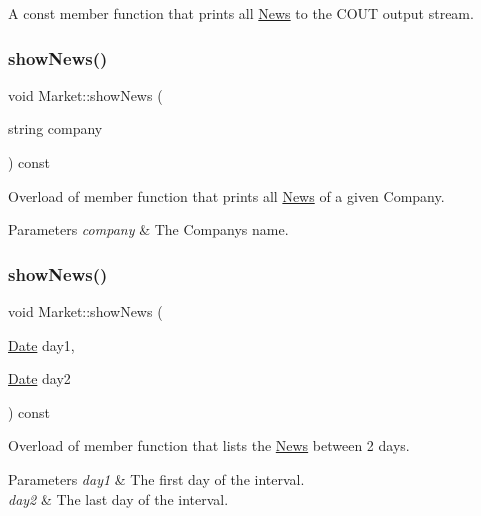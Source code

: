 A const member function that prints all \hyperlink{class_news}{News} to the C\+O\+UT output stream. \hypertarget{class_market_a535cb8ea17975f6f6525a23c84d44cbf}{}\label{class_market_a535cb8ea17975f6f6525a23c84d44cbf} 
\subsubsection{\texorpdfstring{show\+News()}{showNews()}\hspace{0.1cm}{\footnotesize\ttfamily [2/4]}}
{\footnotesize\ttfamily void Market\+::show\+News (\begin{DoxyParamCaption}\item[{string}]{company }\end{DoxyParamCaption}) const}

Overload of member function that prints all \hyperlink{class_news}{News} of a given Company. 
\begin{DoxyParams}{Parameters}
{\em company} & The Company\textquotesingle{}s name. \\
\hline
\end{DoxyParams}
\hypertarget{class_market_ac0a4c5af7d4b8c15a4c58677058909d9}{}\label{class_market_ac0a4c5af7d4b8c15a4c58677058909d9} 
\subsubsection{\texorpdfstring{show\+News()}{showNews()}\hspace{0.1cm}{\footnotesize\ttfamily [3/4]}}
{\footnotesize\ttfamily void Market\+::show\+News (\begin{DoxyParamCaption}\item[{\hyperlink{class_date}{Date}}]{day1,  }\item[{\hyperlink{class_date}{Date}}]{day2 }\end{DoxyParamCaption}) const}

Overload of member function that lists the \hyperlink{class_news}{News} between 2 days. 
\begin{DoxyParams}{Parameters}
{\em day1} & The first day of the interval. \\
\hline
{\em day2} & The last day of the interval. \\
\hline
\end{DoxyParams}
\hypertarget{class_market_a97943574ae26cb5203db0a92c5148b5f}{}\label{class_market_a97943574ae26cb5203db0a92c5148b5f} 
